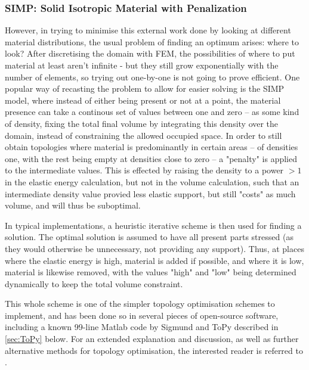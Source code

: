 \subsubsection{SIMP: Solid Isotropic Material with Penalization}
However, in trying to minimise this external work done by looking at different material distributions, the usual problem of finding an optimum arises: where to look? After discretising the domain with FEM, the possibilities of where to put material at least aren't infinite - but they still grow exponentially with the number of elements, so trying out one-by-one is not going to prove efficient. One popular way of recasting the problem to allow for easier solving is the SIMP model, where instead of either being present or not at a point, the material presence can take a continous set of values between one and zero -- as some kind of density, fixing the total final volume by integrating this density over the domain, instead of constraining the allowed occupied space. In order to still obtain topologies where material is predominantly in certain areas -- of densities one, with the rest being empty at densities close to zero -- a "penalty" is applied to the intermediate values. This is effected by raising the density to a power $> 1$ in the elastic energy calculation, but not in the volume calculation, such that an intermediate density value provied less elastic support, but still "costs" as much volume, and will thus be suboptimal. 

In typical implementations, a heuristic iterative scheme is then used for finding a solution. The optimal solution is assumed to have all present parts stressed (as they would otherwise be unnecessary, not providing any support). Thus, at places where the elastic energy is high, material is added if possible, and where it is low, material is likewise removed, with the values "high" and "low" being determined dynamically to keep the total volume constraint. 

This whole scheme is one of the simpler topology optimisation schemes to implement, and has been done so in several pieces of open-source software, including a known 99-line Matlab code by Sigmund \cite{sigmund200199}and ToPy described in \autoref{sec:ToPy} below. For an extended explanation and discussion, as well as further alternative methods for topology optimisation, the interested reader is referred to \cite{bendsoe2003topology}.



